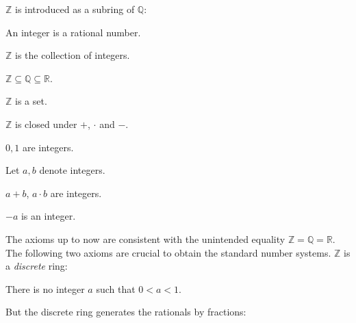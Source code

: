 \documentclass{article}
\begin{document}
$\mathbb{Z}$ is introduced as a subring of $\mathbb{Q}$:

\begin{forthel}

\begin{signature}
An integer is a rational number.
\end{signature}

\begin{definition}
$\mathbb{Z}$ is the collection of integers.
\end{definition}

\begin{lemma}
$\mathbb{Z} \subseteq \mathbb{Q} \subseteq \mathbb{R}$.
\end{lemma}

\begin{lemma}
$\mathbb{Z}$ is a set.
\end{lemma}
\end{forthel}
%
$\mathbb{Z}$ is closed under $+$, $\cdot$ and $-$.
%
\begin{forthel}
\begin{axiom}
$0,1$ are integers.
\end{axiom}

Let $a,b$ denote integers.

\begin{axiom}
$a + b$, $a \cdot b$ are integers.
\end{axiom}

\begin{axiom}
$-a$ is an integer.
\end{axiom}
\end{forthel}
%
The axioms up to now are consistent with the unintended
equality $\mathbb{Z} = \mathbb{Q} = \mathbb{R}$. The following
two axioms are crucial to obtain the standard number systems.
$\mathbb{Z}$ is a {\em discrete} ring:
%
\begin{forthel}
\begin{axiom}
There is no integer $a$ such that $0 < a < 1$.
\end{axiom}
\end{forthel}
%
But the discrete ring generates the rationals by fractions:
%
\end{document}

